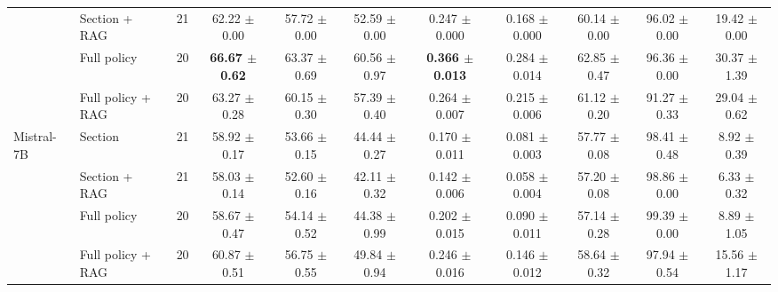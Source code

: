 \begin{table}[!t]
{\begin{tabular}{llrcccccccc}
 & Section + RAG & 21 & 62.22 $\pm$ 0.00 & 57.72 $\pm$ 0.00 & 52.59 $\pm$ 0.00 & 0.247 $\pm$ 0.000 & 0.168 $\pm$ 0.000 & 60.14 $\pm$ 0.00 & 96.02 $\pm$ 0.00 & 19.42 $\pm$ 0.00 \\
 & Full policy & 20 & \textbf{66.67 $\pm$ 0.62} & 63.37 $\pm$ 0.69 & 60.56 $\pm$ 0.97 & \textbf{0.366 $\pm$ 0.013} & 0.284 $\pm$ 0.014 & 62.85 $\pm$ 0.47 & 96.36 $\pm$ 0.00 & 30.37 $\pm$ 1.39 \\
 & Full policy + RAG & 20 & 63.27 $\pm$ 0.28 & 60.15 $\pm$ 0.30 & 57.39 $\pm$ 0.40 & 0.264 $\pm$ 0.007 & 0.215 $\pm$ 0.006 & 61.12 $\pm$ 0.20 & 91.27 $\pm$ 0.33 & 29.04 $\pm$ 0.62 \\
\midrule
Mistral-7B & Section & 21 & 58.92 $\pm$ 0.17 & 53.66 $\pm$ 0.15 & 44.44 $\pm$ 0.27 & 0.170 $\pm$ 0.011 & 0.081 $\pm$ 0.003 & 57.77 $\pm$ 0.08 & 98.41 $\pm$ 0.48 & 8.92 $\pm$ 0.39 \\
 & Section + RAG & 21 & 58.03 $\pm$ 0.14 & 52.60 $\pm$ 0.16 & 42.11 $\pm$ 0.32 & 0.142 $\pm$ 0.006 & 0.058 $\pm$ 0.004 & 57.20 $\pm$ 0.08 & 98.86 $\pm$ 0.00 & 6.33 $\pm$ 0.32 \\
 & Full policy & 20 & 58.67 $\pm$ 0.47 & 54.14 $\pm$ 0.52 & 44.38 $\pm$ 0.99 & 0.202 $\pm$ 0.015 & 0.090 $\pm$ 0.011 & 57.14 $\pm$ 0.28 & 99.39 $\pm$ 0.00 & 8.89 $\pm$ 1.05 \\
 & Full policy + RAG & 20 & 60.87 $\pm$ 0.51 & 56.75 $\pm$ 0.55 & 49.84 $\pm$ 0.94 & 0.246 $\pm$ 0.016 & 0.146 $\pm$ 0.012 & 58.64 $\pm$ 0.32 & 97.94 $\pm$ 0.54 & 15.56 $\pm$ 1.17 \\
\bottomrule
\end{tabular}
}
\end{table}